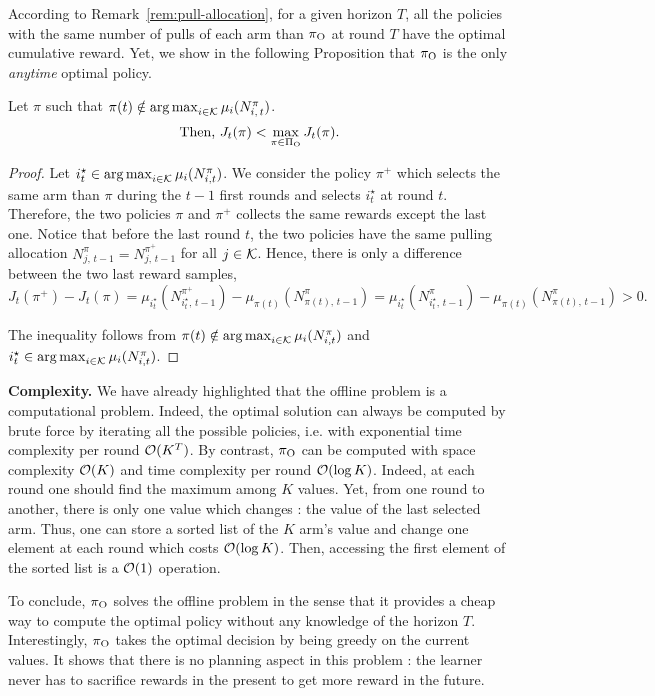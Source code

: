 According to Remark~\ref{rem:pull-allocation}, for a given horizon $T$, all the policies with the same number of pulls of each arm than $\pi_{\rm O}$ at round $T$ have the optimal cumulative reward. Yet, we show in the following Proposition that $\pi_{\rm O}$ is the only \emph{anytime} optimal policy.
\begin{proposition}
Let $\pi$ such that $\pi(t) \notin \operatorname*{arg\,max}_{i\in \mathcal{K}} \mu_i(N_{i,\,t}^\pi)$.
\[\text{Then, } J_t(\pi) < \max_{\pi \in \Pi_{\rm O}} J_t(\pi).\]
\end{proposition}
\begin{proof}
Let $i^\star_t \in \operatorname*{arg\,max}_{i\in \mathcal{K}} \mu_i(N_{i,t}^\pi)$. We consider the policy $\pi^+$ which selects the same arm than $\pi$ during the $t-1$ first rounds and selects $i^\star_t$ at round $t$. Therefore, the two policies $\pi$ and $\pi^+$ collects the same rewards except the last one. Notice that before the last round $t$, the two policies have the same pulling allocation $N_{j,\,t-1}^\pi = N_{j,\,t-1}^{\pi^+}$ for all $j \in \mathcal{K}$.  Hence, there is only a difference between the two last reward samples,
\[ 
J_t(\pi^+) - J_t(\pi) =  \mu_{i^\star_t}(N_{i^\star_t,\,t-1}^{\pi^+}) - \mu_{\pi(t)}(N_{\pi(t),\,t-1}^{\pi}) = \mu_{i^\star_t}(N_{i^\star_t,\,t-1}^{\pi}) - \mu_{\pi(t)}(N_{\pi(t),\,t-1}^{\pi}) > 0.
\]

The inequality follows from $\pi(t) \notin \operatorname*{arg\,max}_{i\in \mathcal{K}} \mu_i(N_{i,t}^\pi)$ and $i^\star_t \in \operatorname*{arg\,max}_{i\in \mathcal{K}} \mu_i(N_{i,t}^\pi)$.
\end{proof}

\begin{remark}
\textbf{Complexity.} We have already highlighted that the offline problem is a computational problem. Indeed, the optimal solution can always be computed by brute force by iterating all the possible policies, i.e. with exponential time complexity per round $\mathcal{O}(K^T)$. By contrast, $\pi_{\rm O}$ can be computed with space complexity $\mathcal{O}(K)$ and time complexity per round $\mathcal{O}(\log{K})$. Indeed, at each round one should find the maximum among $K$ values. Yet, from one round to another, there is only one value which changes : the value of the last selected arm. Thus, one can store a sorted list of the $K$ arm's value and change one element at each round which costs $\mathcal{O}(\log{K})$. Then, accessing the first element of the sorted list is a $\mathcal{O}(1)$ operation.
\end{remark}

To conclude, $\pi_{\rm O}$ solves the offline problem in the sense that it provides a cheap way to compute the optimal policy without any knowledge of the horizon $T$. Interestingly, $\pi_{\rm O}$ takes the optimal decision by being greedy on the current values. It shows that there is no planning aspect in this problem : the learner never has to sacrifice rewards in the present to get more reward in the future.

